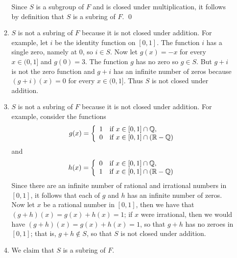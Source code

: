 \begin{enumerate}
\begin{enumerate}
               Since $S$ is a subgroup of $F$ and is closed under
               multiplication, it follows by definition that $S$ is a subring of 
               $F$. \qed
         \item $S$ is not a subring of $F$ because it is not closed under
               addition. For example, let $i$ be the identity function on
               $[0, 1]$. The function $i$ has a single zero, namely at 0, so
               $i \in S$. Now let $g(x) = -x$ for every $x \in (0, 1]$ and
               $g(0) = 3$. The function $g$ has no zero so $g \in S$. But
               $g + i$ is not the zero function and $g + i$ has an infinite   
               number of zeros because $(g + i)(x) = 0$ for every
               $x \in (0, 1]$. Thus $S$ is not closed under addition.
         \item $S$ is not a subring of $F$ because it is not closed under
               addition. For example, consider the functions
               \begin{equation*}
                  g(x) = \left\{
                     \begin{array}{rl}
                        1 & \text{if } x \in [0, 1] \cap \mathbb{Q},\\
                        0 & \text{if } x \in [0, 1] \cap (\mathbb{R} - \mathbb{Q})
                     \end{array} \right.
               \end{equation*}
               and
               \begin{equation*}
                  h(x) = \left\{
                     \begin{array}{rl}
                        0 & \text{if } x \in [0, 1] \cap \mathbb{Q},\\
                        1 & \text{if } x \in [0, 1] \cap (\mathbb{R} - \mathbb{Q})
                     \end{array} \right.
               \end{equation*}
               Since there are an infinite number of rational and irrational
               numbers in $[0, 1]$, it follows that each of $g$ and $h$ has an
               infinite number of zeros. Now let $x$ be a rational number in
               $[0, 1]$, then we have that $(g + h)(x) = g(x) + h(x) = 1$; if
               $x$ were irrational, then we would have
               $(g + h)(x) = g(x) + h(x) = 1$, so that $g + h$ has no zeroes in
               $[0, 1]$; that is, $g + h \notin S$, so that $S$ is not closed
               under addition.
         \item We claim that $S$ is a subring of $F$.


\end{enumerate}
\end{enumerate}
